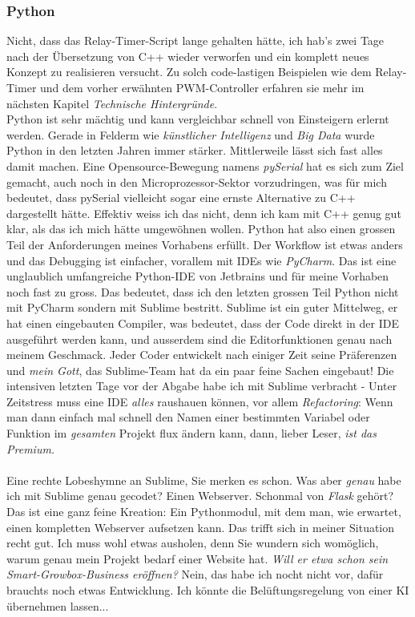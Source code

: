 \documentclass[12pt,titlepage,a4paper]{article}
\begin{document}
\subsubsection{Python}
Nicht, dass das Relay-Timer-Script lange gehalten hätte, ich hab's zwei Tage nach der Übersetzung von C++ wieder verworfen und ein komplett neues Konzept zu realisieren versucht. Zu solch code-lastigen Beispielen wie dem Relay-Timer und dem vorher erwähnten PWM-Controller erfahren sie mehr im nächsten Kapitel \textit{Technische Hintergründe}.\\Python ist sehr mächtig und kann vergleichbar schnell von Einsteigern erlernt werden. Gerade in Felderm wie \textit{künstlicher Intelligenz} und\textit{ Big Data} wurde Python in den letzten Jahren immer stärker. Mittlerweile lässt sich fast alles damit machen. Eine Opensource-Bewegung namens \textit{pySerial} hat es sich zum Ziel gemacht, auch noch in den Microprozessor-Sektor vorzudringen, was für mich bedeutet, dass pySerial vielleicht sogar eine ernste Alternative zu C++ dargestellt hätte. Effektiv weiss ich das nicht, denn ich kam mit C++ genug gut klar, als das ich mich hätte umgewöhnen wollen. Python hat also einen grossen Teil der Anforderungen meines Vorhabens erfüllt. Der Workflow ist etwas anders und das Debugging ist einfacher, vorallem mit IDEs wie \textit{PyCharm}. Das ist eine unglaublich umfangreiche Python-IDE von Jetbrains und für meine Vorhaben noch fast zu gross. Das bedeutet, dass ich den letzten grossen Teil Python nicht mit PyCharm sondern mit Sublime bestritt. Sublime ist ein guter Mittelweg, er hat einen eingebauten Compiler, was bedeutet, dass der Code direkt in der IDE ausgeführt werden kann, und ausserdem sind die Editorfunktionen genau nach meinem Geschmack. Jeder Coder entwickelt nach einiger Zeit seine Präferenzen und \textit{mein Gott}, das Sublime-Team hat da ein paar feine Sachen eingebaut! Die intensiven letzten Tage vor der Abgabe habe ich mit Sublime verbracht - Unter Zeitstress muss eine IDE \textit{alles} raushauen können, vor allem \textit{Refactoring}: Wenn man dann einfach mal schnell den Namen einer bestimmten Variabel oder Funktion im \textit{gesamten} Projekt flux ändern kann, dann, lieber Leser, \textit{ist das Premium.}
\\ \\ 
Eine rechte Lobeshymne an Sublime, Sie merken es schon. Was aber \textit{genau} habe ich mit Sublime genau gecodet? Einen Webserver. Schonmal von \textit{Flask} gehört? Das ist eine ganz feine Kreation: Ein Pythonmodul, mit dem man, wie erwartet, einen kompletten Webserver aufsetzen kann. Das trifft sich in meiner Situation recht gut. Ich muss wohl etwas ausholen, denn Sie wundern sich womöglich, warum genau mein Projekt bedarf einer Website hat. \textit{Will er etwa schon sein Smart-Growbox-Business eröffnen?} Nein, das habe ich nocht nicht vor, dafür brauchts noch etwas Entwicklung. Ich könnte die Belüftungsregelung von einer KI übernehmen lassen... \\
\end{document}

